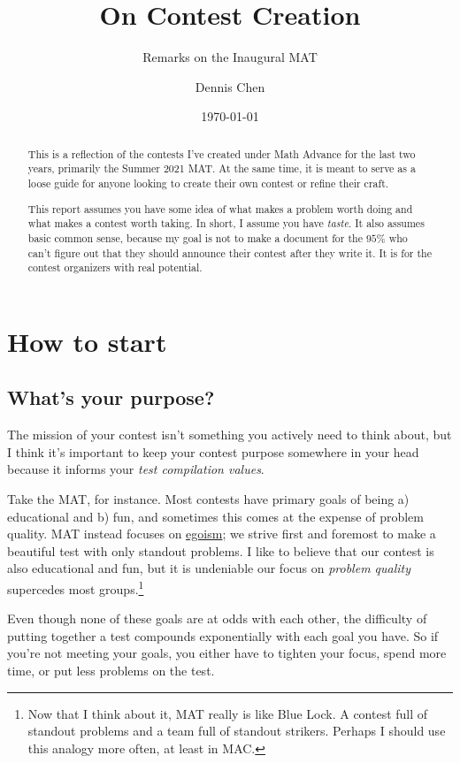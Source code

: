 \documentclass[points=false]{bounce}
\title{On Contest Creation}
\subtitle{Remarks on the Inaugural MAT}
\author{Dennis Chen}
\date{\today}
\begin{document}
\maketitle

\begin{abstract}
    This is a reflection of the contests I've created under Math Advance for the last two years, primarily the Summer 2021 MAT. At the same time, it is meant to serve as a loose guide for anyone looking to create their own contest or refine their craft.

    This report assumes you have some idea of what makes a problem worth doing and what makes a contest worth taking. In short, I assume you have \emph{taste}. It also assumes basic common sense, because my goal is not to make a document for the $95\%$ who can't figure out that they should announce their contest after they write it. It is for the contest organizers with real potential.
\end{abstract}

\section{How to start}

\subsection{What's your purpose?}

The mission of your contest isn't something you actively need to think about, but I think it's important to keep your contest purpose somewhere in your head because it informs your \emph{test compilation values}.

Take the MAT, for instance. Most contests have primary goals of being a) educational and b) fun, and sometimes this comes at the expense of problem quality. MAT instead focuses on \href{https://myanimelist.net/manga/114745/Blue_Lock}{egoism}; we strive first and foremost to make a beautiful test with only standout problems. I like to believe that our contest is also educational and fun, but it is undeniable our focus on \emph{problem quality} supercedes most groups.\footnote{Now that I think about it, MAT really is like Blue Lock. A contest full of standout problems and a team full of standout strikers. Perhaps I should use this analogy more often, at least in MAC.}

Even though none of these goals are at odds with each other, the difficulty of putting together a test compounds exponentially with each goal you have. So if you're not meeting your goals, you either have to tighten your focus, spend more time, or put less problems on the test.
\end{document}

